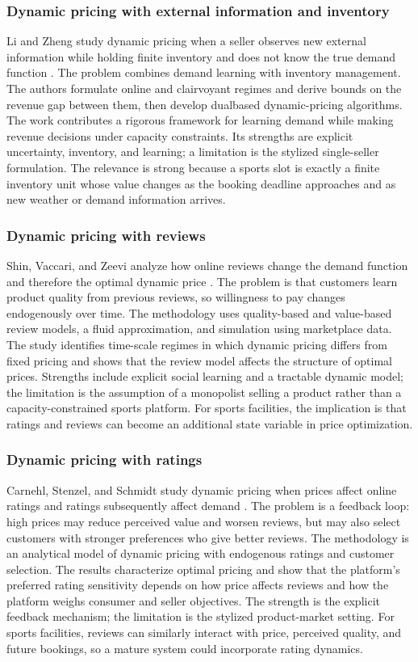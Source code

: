 \subsubsection{Dynamic pricing with external information and inventory}
Li and Zheng study dynamic pricing when a seller observes new external information while holding finite inventory and does not know the true demand function \cite{r12}. The problem combines demand learning with inventory management. The authors formulate online and clairvoyant regimes and derive bounds on the revenue gap between them, then develop dualbased dynamic-pricing algorithms. The work contributes a rigorous framework for learning demand while making revenue decisions under capacity constraints. Its strengths are explicit uncertainty, inventory, and learning; a limitation is the stylized single-seller formulation. The relevance is strong because a sports slot is exactly a finite inventory unit whose value changes as the booking deadline approaches and as new weather or demand information arrives.

\subsubsection{Dynamic pricing with reviews}
Shin, Vaccari, and Zeevi analyze how online reviews change the demand function and therefore the optimal dynamic price \cite{r13}. The problem is that customers learn product quality from previous reviews, so willingness to pay changes endogenously over time. The methodology uses quality-based and value-based review models, a fluid approximation, and simulation using marketplace data. The study identifies time-scale regimes in which dynamic pricing differs from fixed pricing and shows that the review model affects the structure of optimal prices. Strengths include explicit social learning and a tractable dynamic model; the limitation is the assumption of a monopolist selling a product rather than a capacity-constrained sports platform. For sports facilities, the implication is that ratings and reviews can become an additional state variable in price optimization.

\subsubsection{Dynamic pricing with ratings}
Carnehl, Stenzel, and Schmidt study dynamic pricing when prices affect online ratings and ratings subsequently affect demand \cite{r14}. The problem is a feedback loop: high prices may reduce perceived value and worsen reviews, but may also select customers with stronger preferences who give better reviews. The methodology is an analytical model of dynamic pricing with endogenous ratings and customer selection. The results characterize optimal pricing and show that the platform's preferred rating sensitivity depends on how price affects reviews and how the platform weighs consumer and seller objectives. The strength is the explicit feedback mechanism; the limitation is the stylized product-market setting. For sports facilities, reviews can similarly interact with price, perceived quality, and future bookings, so a mature system could incorporate rating dynamics.


